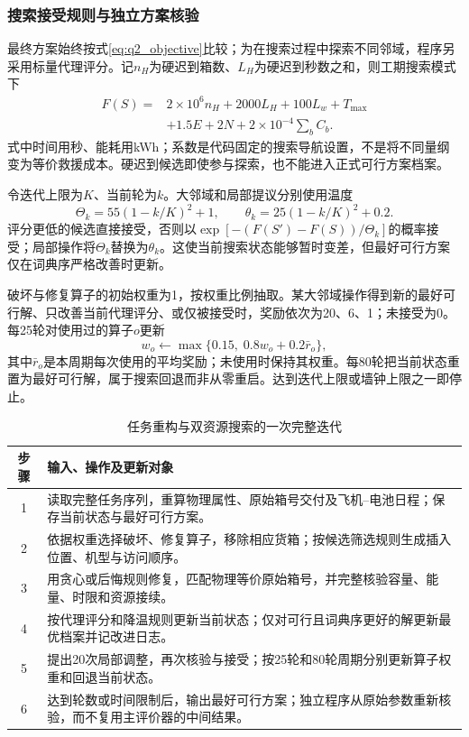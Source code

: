 \documentclass[withoutpreface,colorprint]{format}
\numberwithin{equation}{section}
\numberwithin{figure}{section}
\numberwithin{table}{section}
\begin{document}
\subsubsection{搜索接受规则与独立方案核验}
最终方案始终按式\eqref{eq:q2_objective}比较；为在搜索过程中探索不同邻域，程序另采用标量代理评分。记$n_H$为硬迟到箱数、$L_H$为硬迟到秒数之和，则工期搜索模式下
\begin{equation}
\begin{split}
 F(S)={}&2\times10^6n_H+2000L_H+100L_w+T_{\max}\\
        &+1.5E+2N+2\times10^{-4}\sum_bC_b .
\end{split}
\label{eq:q2_search_score}
\end{equation}
式中时间用秒、能耗用kWh；系数是代码固定的搜索导航设置，不是将不同量纲变为等价救援成本。硬迟到候选即使参与探索，也不能进入正式可行方案档案。

令迭代上限为$K$、当前轮为$k$。大邻域和局部提议分别使用温度
\begin{equation}
 \Theta_k=55(1-k/K)^2+1,\qquad
 \theta_k=25(1-k/K)^2+0.2.
 \label{eq:q2_temperature}
\end{equation}
评分更低的候选直接接受，否则以$\exp[-(F(S')-F(S))/\Theta_k]$的概率接受；局部操作将$\Theta_k$替换为$\theta_k$。这使当前搜索状态能够暂时变差，但最好可行方案仅在词典序严格改善时更新。

破坏与修复算子的初始权重为1，按权重比例抽取。某大邻域操作得到新的最好可行解、只改善当前代理评分、或仅被接受时，奖励依次为20、6、1；未接受为0。每25轮对使用过的算子$o$更新
\begin{equation}
 w_o\leftarrow\max\{0.15,\;0.8w_o+0.2\bar r_o\},
 \label{eq:q2_operator_weight}
\end{equation}
其中$\bar r_o$是本周期每次使用的平均奖励；未使用时保持其权重。每80轮把当前状态重置为最好可行解，属于搜索回退而非从零重启。达到迭代上限或墙钟上限之一即停止。

\begin{table}[htbp]\centering\small
\caption{任务重构与双资源搜索的一次完整迭代}\label{tab:q2_algorithm}
\begin{tabularx}{\linewidth}{cX}\toprule
步骤 & 输入、操作及更新对象\\\midrule
1 & 读取完整任务序列，重算物理属性、原始箱号交付及飞机--电池日程；保存当前状态与最好可行方案。\\
2 & 依据权重选择破坏、修复算子，移除相应货箱；按候选筛选规则生成插入位置、机型与访问顺序。\\
3 & 用贪心或后悔规则修复，匹配物理等价原始箱号，并完整核验容量、能量、时限和资源接续。\\
4 & 按代理评分和降温规则更新当前状态；仅对可行且词典序更好的解更新最优档案并记改进日志。\\
5 & 提出20次局部调整，再次核验与接受；按25轮和80轮周期分别更新算子权重和回退当前状态。\\
6 & 达到轮数或时间限制后，输出最好可行方案；独立程序从原始参数重新核验，而不复用主评价器的中间结果。\\\bottomrule
\end{tabularx}
\end{table}
\end{document}
